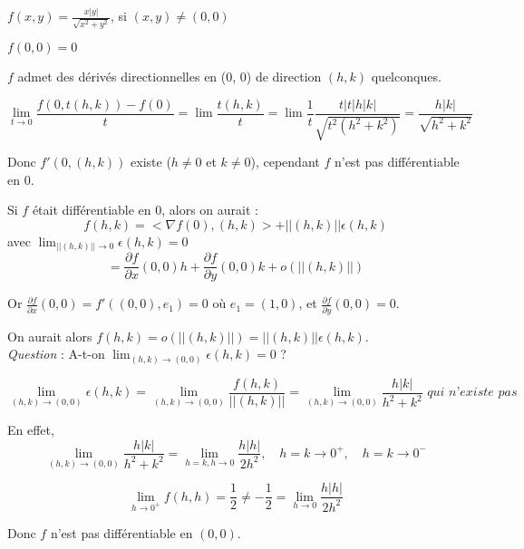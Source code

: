 		\begin{exemple} 
		
		$f(x, y) = \frac{x |y|}{\sqrt{x^2+y^2}}$, si $(x, y) \ne (0, 0)$
		
		$f(0, 0) = 0$
		
		$f$ admet des dérivés directionnelles en (0, 0) de direction $(h, k)$ quelconques.
		
		\[ \lim_{t \rightarrow 0} \frac{ f(0, t(h, k)) - f(0) }{t} = \lim \frac{ t(h, k)}{t} = \lim \frac{1}{t} \frac{t |t| h |k|}{ \sqrt{t^2 (h^2+k^2)}} = \frac{h|k|}{\sqrt{h^2+k^2}} \]
		
		Donc $f'(0, (h, k))$ existe ($h\ne0$ et $k\ne0$), cependant $f$ n'est pas différentiable en $0$.
		
		Si $f$ était différentiable en 0, alors on aurait : \[ f(h, k) = < \nabla f(0), (h, k)> + ||(h, k)|| \epsilon (h, k) \] 
		avec $\lim_{||(h, k)|| \rightarrow 0} \epsilon (h, k) = 0$
		\[ = \frac{ \partial f}{\partial x} (0, 0) h + \frac{ \partial f}{\partial y} (0, 0) k + o(||(h, k)||) \]
		
		Or $ \frac{ \partial f}{\partial x} (0, 0) = f' ((0, 0), e_1) = 0$ où $e_1 = (1, 0)$, et $ \frac{ \partial f}{\partial y} (0, 0) = 0$.
		
		On aurait alors $f(h, k) = o(||(h, k)||) = ||(h, k)|| \epsilon (h, k)$.\\
		
		\emph{Question} : A-t-on $\lim_{(h, k) \rightarrow (0, 0)} \epsilon (h, k) = 0 $ ?
		
		\[\lim_{(h, k) \rightarrow (0, 0)} \epsilon (h, k) = \lim_{(h, k) \rightarrow (0, 0)} \frac{f(h, k)}{||(h, k)||} = \lim_{(h, k) \rightarrow (0, 0)} \frac{h|k|}{h^2+k^2}\textit{ qui n'existe pas} \]
		
		En effet, \[ \lim_{(h, k) \rightarrow (0, 0)} \frac{h|k|}{h^2+k^2} = \lim_{h=k, h \rightarrow 0} \frac{h|h|}{2h^2}, \quad h=k \rightarrow 0^+, \quad h=k \rightarrow 0^- \]
		
		\[ \lim_{h \rightarrow 0^+} f(h, h) = \frac{1}{2} \ne -\frac{1}{2} = \lim_{h \rightarrow 0} \frac{h|h|}{2h^2} \]
		
		Donc $f$ n'est pas différentiable en $(0, 0)$.
		\end{exemple}
		
